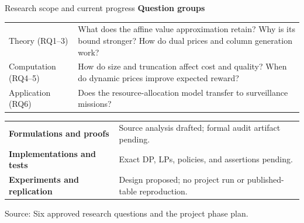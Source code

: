 \documentclass[aspectratio=169,10pt]{beamer}
\newcommand{\src}[1]{\par\vfill{\tiny\color{muted}Source: #1\par}}
\begin{document}
\begin{frame}[t]{Research scope and current progress}
\small
\textbf{Question groups}
\begin{tabularx}{\textwidth}{@{}p{}X@{}}
\toprule
Theory (RQ1--3) & What does the affine value approximation retain? Why is its bound stronger? How do dual prices and column generation work?\\
Computation (RQ4--5) & How do size and truncation affect cost and quality? When do dynamic prices improve expected reward?\\
Application (RQ6) & Does the resource-allocation model transfer to surveillance missions?\\
\bottomrule
\end{tabularx}
\vspace{0.8em}
\begin{tabularx}{\textwidth}{@{}p{}X@{}}
\textbf{Formulations and proofs} & Source analysis drafted; formal audit artifact pending.\\
\textbf{Implementations and tests} & Exact DP, LPs, policies, and assertions pending.\\
\textbf{Experiments and replication} & Design proposed; no project run or published-table reproduction.\\
\end{tabularx}
\src{Six approved research questions and the project phase plan.}
\end{frame}
\end{document}
